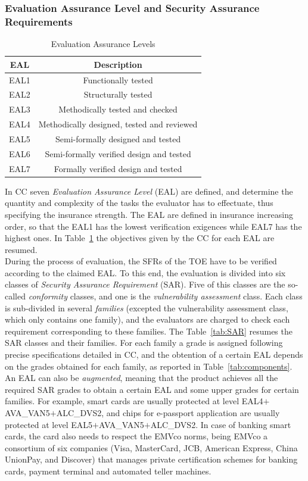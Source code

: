 \subsubsection{Evaluation Assurance Level and Security Assurance Requirements}
\begin{table}[]
\centering
\caption{Evaluation Assurance Levels}
\label{tab:EAL}
\begin{tabular}{cc}
\toprule 
EAL  & Description                                \\
\midrule
EAL1 & Functionally tested                        \\
EAL2 & Structurally tested                        \\
EAL3 & Methodically tested and checked            \\
EAL4 & Methodically designed, tested and reviewed \\
EAL5 & Semi-formally designed and tested          \\
EAL6 & Semi-formally verified design and tested   \\
EAL7 & Formally verified design and tested      \\
\bottomrule
\end{tabular}
\end{table}

In CC seven  \emph{Evaluation Assurance Level} (EAL) are defined, and determine the quantity and complexity of the tasks the evaluator has to effectuate, thus specifying the insurance strength. The EAL are defined in insurance increasing order, so that the EAL1 has the lowest verification exigences while EAL7 has the highest ones. In Table~\ref{tab:EAL} the objectives given by the CC for each EAL are resumed.\\

During the process of evaluation, the SFRs of the TOE have to be verified according to the claimed EAL. To this end, the evaluation is  divided into six classes of \emph{Security Assurance Requirement} (SAR). Five of this classes are the so-called \emph{conformity} classes, and one is the \emph{vulnerability assessment} class. Each class is sub-divided in several \emph{families} (excepted the vulnerability assessment class, which only contains one family), and the evaluators are charged to check each requirement corresponding to these families. The Table~\ref{tab:SAR} resumes the SAR classes and their families. For each family a grade is assigned following precise specifications detailed in CC, and the obtention of a certain EAL depends on the grades obtained for each family, as reported in Table~\ref{tab:components}. An EAL can also be \emph{augmented}, meaning that the product achieves all the required SAR grades to obtain a certain EAL and some upper grades for certain families. For example, smart cards are usually protected at level EAL4$+$AVA\_VAN5$+$ALC\_DVS2, and chips for e-passport application are usually protected at level EAL5$+$AVA\_VAN5$+$ALC\_DVS2. In case of banking smart cards, the card also needs to respect the EMVco norms, being EMVco a consortium of six companies (Visa, MasterCard, JCB, American Express, China UnionPay, and Discover) that manages private certification schemes for banking cards, payment terminal and automated teller machines. 


